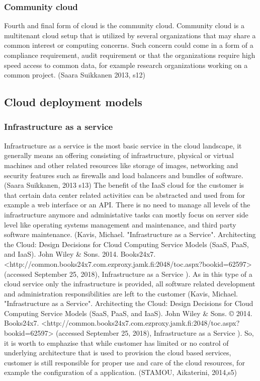 \documentclass{article}
\begin{document}
\subsubsection{Community cloud}
Fourth and final form of cloud is the community cloud. Community cloud is a multitenant cloud setup that is utilized by several organizations that may share a common interest or computing concerns. Such concern could come in a form of a compliance requirement, audit requirement or that the organizations require high speed access to common data, for example research organizations working on a common project. (Saara Suikkanen 2013, s12)
\subsection{Cloud deployment models}
\subsubsection{Infrastructure as a service}
Infrastructure as a service is the most basic service in the cloud landscape, it generally means an offering consisting of infrastructure, physical or virtual machines and other related resources like storage of images, networking and security features such as firewalls and load balancers and bundles of software. (Saara Suikkanen, 2013 s13)
The benefit of the IaaS cloud for the customer is that certain data center related activities can be abstracted and used from for example a web interface or an API. There is no need to manage all levels of the infrastructure anymore and administative tasks can mostly focus on server side level like operating systems management and maintenance, and third party software maintenance. (Kavis, Michael. "Infrastructure as a Service". Architecting the Cloud: Design Decisions for Cloud Computing Service Models (SaaS, PaaS, and IaaS). John Wiley \& Sons. 2014. Books24x7. <http://common.books24x7.com.ezproxy.jamk.fi:2048/toc.aspx?bookid=62597> (accessed September 25, 2018), Infrastructure as a Service ).
As in this type of a cloud service only the infrastructure is provided, all software related development and administration responsibilities are left to the customer (Kavis, Michael. "Infrastructure as a Service". Architecting the Cloud: Design Decisions for Cloud Computing Service Models (SaaS, PaaS, and IaaS). John Wiley \& Sons. © 2014. Books24x7. <http://common.books24x7.com.ezproxy.jamk.fi:2048/toc.aspx?bookid=62597> (accessed September 25, 2018), Infrastructure as a Service ).
So, it is worth to emphazise that while customer has limited or no control of underlying architecture that is used to provision the cloud based services, customer is still responsible for proper use and care of the cloud resources, for example the configuration of a application. (STAMOU, Aikaterini, 2014,s5)
\end{document}
